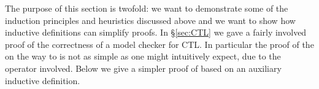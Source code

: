 %
\begin{isabellebody}%
\def\isabellecontext{CTLind}%
%
%
\begin{isamarkuptext}%
\label{sec:CTL-revisited}
The purpose of this section is twofold: we want to demonstrate
some of the induction principles and heuristics discussed above and we want to
show how inductive definitions can simplify proofs.
In \S\ref{sec:CTL} we gave a fairly involved proof of the correctness of a
model checker for CTL\@. In particular the proof of the
 on the way to  is not as
simple as one might intuitively expect, due to the  operator
involved. Below we give a simpler proof of 
based on an auxiliary inductive definition.


\end{isamarkuptext}
\end{isabellebody}
